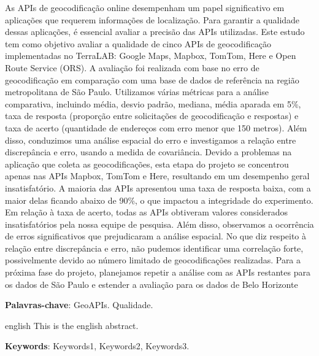 
\setlength{\absparsep}{18pt} %
\begin{resumo}
  As APIs de geocodificação online desempenham um papel significativo em aplicações que requerem informações de localização. Para garantir a qualidade dessas aplicações, é essencial avaliar a precisão das APIs utilizadas. Este estudo tem como objetivo avaliar a qualidade de cinco APIs de geocodificação implementadas no TerraLAB: Google Maps, Mapbox, TomTom, Here e Open Route Service (ORS). A avaliação foi realizada com base no erro de geocodificação em comparação com uma base de dados de referência na região metropolitana de São Paulo.
  Utilizamos várias métricas para a análise comparativa, incluindo média, desvio padrão, mediana, média aparada em 5\%, taxa de resposta (proporção entre solicitações de geocodificação e respostas) e taxa de acerto (quantidade de endereços com erro menor que 150 metros). Além disso, conduzimos uma análise espacial do erro e investigamos a relação entre discrepância e erro, usando a medida de covariância. Devido a problemas na aplicação que coleta as geocodificações, esta etapa do projeto se concentrou apenas nas APIs Mapbox, TomTom e Here, resultando em um desempenho geral insatisfatório.
  A maioria das APIs apresentou uma taxa de resposta baixa, com a maior delas ficando abaixo de 90\%, o que impactou a integridade do experimento. Em relação à taxa de acerto, todas as APIs obtiveram valores considerados insatisfatórios pela nossa equipe de pesquisa. Além disso, observamos a ocorrência de erros significativos que prejudicaram a análise espacial. No que diz respeito à relação entre discrepância e erro, não pudemos identificar uma correlação forte, possivelmente devido ao número limitado de geocodificações realizadas.
  Para a próxima fase do projeto, planejamos repetir a análise com as APIs restantes para os dados de São Paulo e estender a avaliação para os dados de Belo Horizonte
  
 \vspace{\onelineskip}
 \noindent
 \textbf{Palavras-chave}: GeoAPIs. Qualidade. 

\end{resumo}

\begin{resumo}[Abstract]
 \begin{otherlanguage*}{english}
   This is the english abstract.


   \vspace{\onelineskip}
   \noindent 
   \textbf{Keywords}: Keywords1, Keywords2, Keywords3.
 \end{otherlanguage*}
\end{resumo}